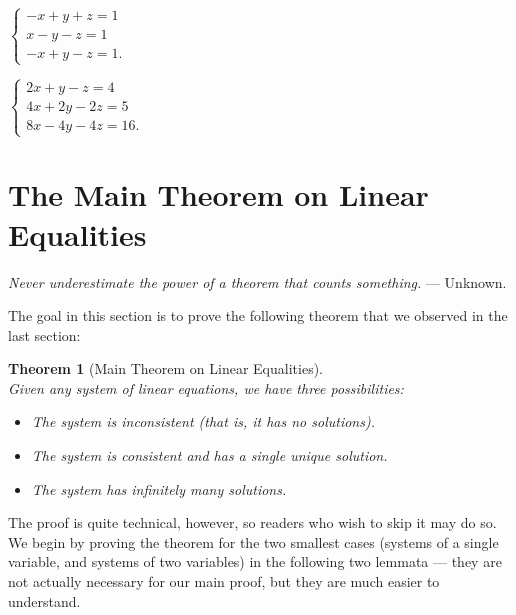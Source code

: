 \documentclass[a4paper,leqno]{article}
\numberwithin{equation}{section}
\newtheorem{thm}[equation]{Theorem}
\theoremstyle{definition}
\theoremstyle{remark}
\begin{document}
\begin{enumerate}
\begin{center}
\begin{enumerate*}
        \item
          $ \displaystyle
            \begin{cases}
              - x + y + z = 1\\
              x - y - z = 1\\
              -x + y - z = 1.
            \end{cases}
          $\hspace*{\fill}
        \item
          $ \displaystyle
            \begin{cases}
              2x + y - z = 4\\
              4x + 2y - 2z = 5\\
              8x - 4y - 4z = 16.
            \end{cases}
          $\hspace*{\fill}
      \end{enumerate*}
    \end{center}
\end{enumerate}

\section{The Main Theorem on Linear Equalities}
\begin{center}
  \emph{Never underestimate the power of a theorem that counts something.}  --- Unknown.
\end{center}
The goal in this section is to prove the following theorem that we observed in the last section:
\begin{thm}[Main Theorem on Linear Equalities]\ \\
  Given any system of linear equations, we have three possibilities:
  \begin{itemize}
    \item The system is inconsistent (that is, it has no solutions).
    \item The system is consistent and has a single unique solution.
    \item The system has infinitely many solutions.
  \end{itemize}
\end{thm}

The proof is quite technical, however, so readers who wish to skip it may do so. We begin by proving the theorem for the two smallest cases (systems
of a single variable, and systems of two variables) in the following two lemmata --- they are not actually necessary for our main proof, but they are
much easier to understand.
\end{document}
